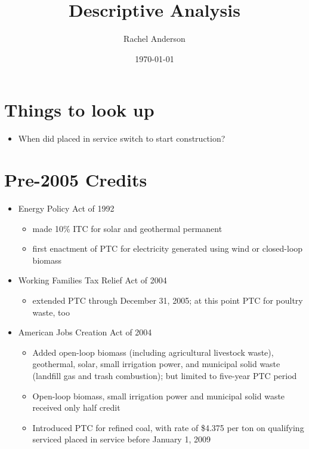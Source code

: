 \documentclass[11pt, oneside]{article}   	%
\title{Descriptive Analysis}
\author{Rachel Anderson}
\date{\today}							%
\begin{document}
\maketitle

\section{Things to look up}
\begin{itemize}
\item When did placed in service switch to start construction? 
\end{itemize}

\section{Pre-2005 Credits}
\begin{itemize}
\item Energy Policy Act of 1992
\begin{itemize}
\item made 10\% ITC for solar and geothermal permanent
\item first enactment of PTC for electricity generated using wind or closed-loop biomass 
\end{itemize}

\item Working Families Tax Relief Act of 2004
\begin{itemize}
\item extended PTC through December 31, 2005; at this point PTC for poultry waste, too
\end{itemize}

\item American Jobs Creation Act of 2004 
\begin{itemize}
\item Added open-loop biomass (including agricultural livestock waste), geothermal, solar, small irrigation power, and municipal solid waste (landfill gas and trash combustion); but limited to five-year PTC period
\item Open-loop biomass, small irrigation power and municipal solid waste received only half credit
\item Introduced PTC for refined coal, with rate of \$4.375 per ton on qualifying serviced placed in service before January 1, 2009
\end{itemize}

\end{itemize}
\end{document}
